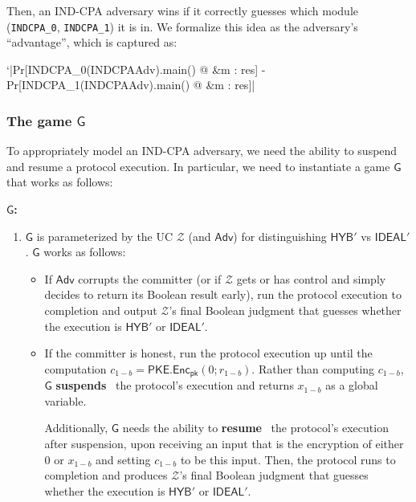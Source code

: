 \documentclass{article}[12pt]
\newcommand{\parhead}[1]{\textbf{#1}~}
\renewcommand{\emph}[1]{\textbf{#1}~}
\newcommand{\code}[1]{\texttt{#1}} %
\newcommand{\PKE}{\mathsf{PKE}}
\newcommand{\Enc}{\mathsf{Enc}}
\newcommand{\EncKey}{\mathsf{pk}}
\newcommand{\Adversary}{{\mathsf{Adv}}} %
\newcommand{\Environment}{{\mathcal{Z}}} %
\newcommand{\Ideal}{{\mathsf{IDEAL}}}
\newcommand{\Hyb}{{\mathsf{HYB}}}
\newcommand{\G}{\mathsf{G}}
\begin{document}
Then, an IND-CPA adversary wins if it correctly guesses which module (\code{INDCPA\_0}, \code{INDCPA\_1}) it is in. We formalize this idea as the adversary's ``advantage'', which is captured as:

\begin{easycrypt}[label=code:indcpa_adv, caption={Given an initial memory \code{m}, captures the distance between a) the probability \code{INDCPA\_0.main()} running with the \code{INDCPAAdv} returns true and b) the probability \code{INDCPA\_1.main()} running with the \code{INDCPAAdv} returns true. }]
`|Pr[INDCPA_0(INDCPAAdv).main() @ &m : res] - Pr[INDCPA_1(INDCPAAdv).main() @ &m : res]|
\end{easycrypt}

\subsubsection{The game $\G$}
To appropriately model an IND-CPA adversary, we need the ability to suspend and resume a protocol execution. In particular, we need to instantiate a game $\G$ that works as follows:

\parhead{$\G$:}
\begin{enumerate}
	\item $\G$ is parameterized by the UC $\Environment$ (and $\Adversary$) for distinguishing $\Hyb'$ vs $\Ideal'$. $\G$ works as follows:
	\begin{itemize}
		\item If $\Adversary$ corrupts the committer (or if $\Environment$ gets or has control and simply decides to return its Boolean result early), run the protocol execution to completion and output $\Environment$'s final Boolean judgment that guesses whether the execution is $\Hyb'$ or $\Ideal'$.
		\item If the committer is honest, run the protocol execution up until the computation $c_{1-b} = \PKE.\Enc_{\EncKey}(0; r_{1-b})$. Rather than computing $c_{1-b}$, $\G$ \emph{suspends} the protocol's execution and returns $x_{1-b}$ as a global variable.

		Additionally, $\G$ needs the ability to \emph{resume} the protocol's execution after suspension, upon receiving an input that is the encryption of either $0$ or $x_{1-b}$ and setting $c_{1-b}$ to be this input. Then, the protocol runs to completion and produces $\Environment$'s final Boolean judgment that guesses whether the execution is $\Hyb'$ or $\Ideal'$.

	\end{itemize}
\end{enumerate}
\end{document}
